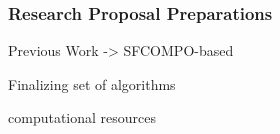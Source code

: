
\begin{frame}
  \frametitle{Research Proposal Preparations}
  Previous Work -> SFCOMPO-based

  Finalizing set of algorithms

  computational resources
\end{frame}

